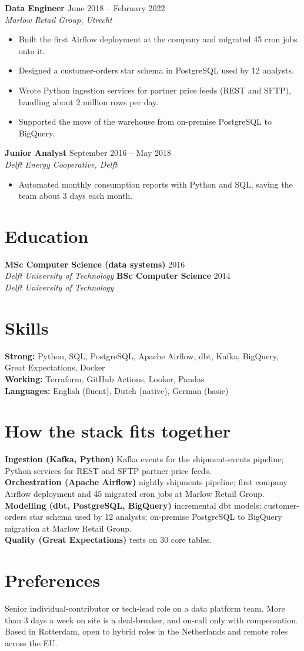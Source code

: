\documentclass[10pt,a4paper]{article}
\newcommand{\entry}[3]{\textbf{#1} \hfill #3\\ \emph{#2}\vspace{-2pt}}
\begin{document}
\entry{Data Engineer}{Marlow Retail Group, Utrecht}{June 2018 -- February 2022}
\begin{itemize}\setlength\itemsep{2pt}
  \item Built the first Airflow deployment at the company and migrated 45 cron jobs onto it.
  \item Designed a customer-orders star schema in PostgreSQL used by 12 analysts.
  \item Wrote Python ingestion services for partner price feeds (REST and SFTP), handling about 2 million rows
        per day.
  \item Supported the move of the warehouse from on-premise PostgreSQL to BigQuery.
\end{itemize}

\entry{Junior Analyst}{Delft Energy Cooperative, Delft}{September 2016 -- May 2018}
\begin{itemize}\setlength\itemsep{2pt}
  \item Automated monthly consumption reports with Python and SQL, saving the team about 3 days each month.
\end{itemize}

\newpage
\section*{Education}
\entry{MSc Computer Science (data systems)}{Delft University of Technology}{2016}
\entry{BSc Computer Science}{Delft University of Technology}{2014}

\section*{Skills}
\textbf{Strong:} Python, SQL, PostgreSQL, Apache Airflow, dbt, Kafka, BigQuery, Great Expectations, Docker\\
\textbf{Working:} Terraform, GitHub Actions, Looker, Pandas\\
\textbf{Languages:} English (fluent), Dutch (native), German (basic)

\section*{How the stack fits together}
\textbf{Ingestion (Kafka, Python)} \quad Kafka events for the shipment-events pipeline; Python services for
REST and SFTP partner price feeds.\\
\textbf{Orchestration (Apache Airflow)} \quad nightly shipments pipeline; first company Airflow deployment
and 45 migrated cron jobs at Marlow Retail Group.\\
\textbf{Modelling (dbt, PostgreSQL, BigQuery)} \quad incremental dbt models; customer-orders star schema used
by 12 analysts; on-premise PostgreSQL to BigQuery migration at Marlow Retail Group.\\
\textbf{Quality (Great Expectations)} \quad tests on 30 core tables.\par

\section*{Preferences}
Senior individual-contributor or tech-lead role on a data platform team. More than 3 days a week on site
is a deal-breaker, and on-call only with compensation. Based in Rotterdam, open to hybrid roles in the
Netherlands and remote roles across the EU.
\end{document}
